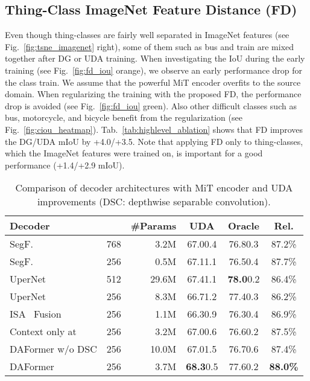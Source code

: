 \documentclass[journal,compsoc]{IEEEtran}
\newcommand{\spm}[1]{\tiny{#1}}
\begin{document}
\subsection{Thing-Class ImageNet Feature Distance (FD)}
\label{sec:exp_fd}

Even though thing-classes are fairly well separated in ImageNet features (see Fig.~\ref{fig:tsne_imagenet} right), some of them such as bus and train are mixed together after DG or UDA training.
When investigating the IoU during the early training (see Fig.~\ref{fig:fd_iou} orange), we observe an early performance drop for the class train. We assume that the powerful MiT encoder overfits to the source domain. When regularizing the training with the proposed FD, the performance drop is avoided (see Fig.~\ref{fig:fd_iou} green). 
Also other difficult classes such as bus, motorcycle, and bicycle benefit from the regularization (see Fig.~\ref{fig:ciou_heatmap}). Tab.~\ref{tab:highlevel_ablation} shows that FD improves the DG/UDA mIoU by +4.0/+3.5. Note that applying FD only to thing-classes, which the ImageNet features were trained on, is important for a good performance (+1.4/+2.9 mIoU).

\begin{table}
\centering
\caption{Comparison of decoder architectures with MiT encoder and UDA improvements (DSC: depthwise separable convolution).}
\label{tab:decoder_fusion}
\footnotesize
\setlength{\tabcolsep}{3.5pt}
\begin{tabular}{lcrccc}
\toprule
            Decoder &  & \#Params &          UDA &         Oracle &   Rel. \\
\midrule
        SegF.~\cite{xie2021segformer} & 768 &  3.2M & 67.0\spm{0.4} & 76.8\spm{0.3} & 87.2\% \\
        SegF.~\cite{xie2021segformer} & 256 &  0.5M & 67.1\spm{1.1} & 76.5\spm{0.4} & 87.7\% \\
        UperNet~\cite{xiao2018unified} & 512 & 29.6M & 67.4\spm{1.1} & \textbf{78.0}\spm{0.2} & 86.4\% \\
        UperNet~\cite{xiao2018unified} & 256 &  8.3M & 66.7\spm{1.2} & 77.4\spm{0.3} & 86.2\% \\
ISA~\cite{huang2019interlaced} Fusion & 256 &  1.1M & 66.3\spm{0.9} & 76.3\spm{0.4} & 86.9\% \\
Context only at  & 256 & 3.2M & 67.0\spm{0.6} & 76.6\spm{0.2} & 87.5\% \\
                        DAFormer w/o DSC & 256 & 10.0M & 67.0\spm{1.5} & 76.7\spm{0.6} & 87.4\% \\
                DAFormer & 256 &  3.7M & \textbf{68.3}\spm{0.5} & 77.6\spm{0.2} & \textbf{88.0\%} \\
\bottomrule
\end{tabular}
\end{table} 
\end{document}
